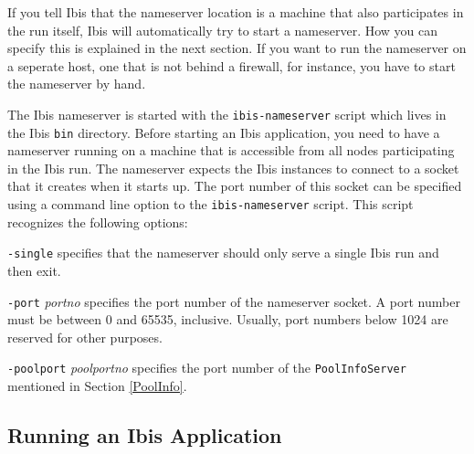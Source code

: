 \documentclass[10pt]{article}
\newcommand{\mysubsection}[1]{\subsection{#1}\label{#1}}
\begin{document}
If you tell Ibis that the nameserver location is a machine that also
participates in the run itself, Ibis will automatically try to start
a nameserver. How you can specify this is explained in the next section.
If you want to run the nameserver on a seperate host, one that is not
behind a firewall, for instance, you have to start the nameserver by
hand.

The Ibis nameserver is started with the \texttt{ibis-nameserver} script which
lives in the Ibis \texttt{bin} directory. Before starting an Ibis application,
you need to have a nameserver running on a machine that is accessible
from all nodes participating in the Ibis run.
The nameserver expects the Ibis instances to connect to a
socket that it creates when it starts up.
The port number of this socket can be specified using a command line
option to the \texttt{ibis-nameserver} script. This script recognizes
the following options:
\begin{description}
\item{\texttt{-single}}
specifies that the nameserver should only serve a single Ibis run
and then exit.
\item{\texttt{-port} \emph{portno}}
specifies the port number of the nameserver socket.
A port number must be between 0 and 65535, inclusive. Usually,
port numbers below 1024 are reserved for other purposes.
\item{\texttt{-poolport} \emph{poolportno}}
specifies the port number of the \texttt{PoolInfoServer} mentioned
in Section \ref{PoolInfo}.
\end{description}

\mysubsection{Running an Ibis Application}
\end{document}

